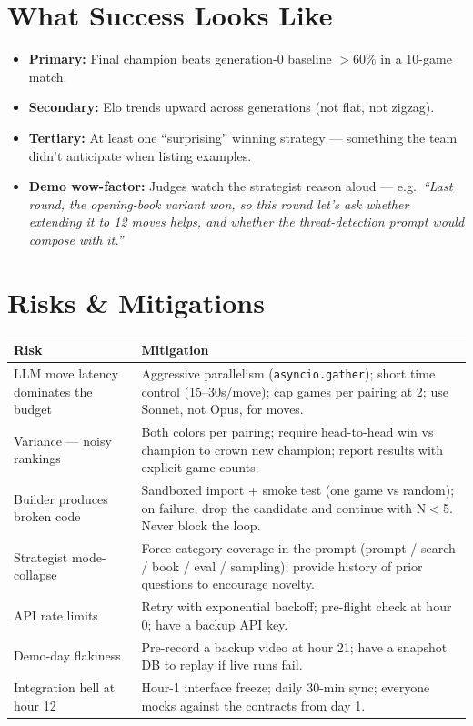 \documentclass[11pt]{article}
\begin{document}
\section{What Success Looks Like}

\begin{itemize}[leftmargin=*]
    \item \textbf{Primary:} Final champion beats generation-0 baseline $>60\%$ in a 10-game match.
    \item \textbf{Secondary:} Elo trends upward across generations (not flat, not zigzag).
    \item \textbf{Tertiary:} At least one ``surprising'' winning strategy --- something the team didn't anticipate when listing examples.
    \item \textbf{Demo wow-factor:} Judges watch the strategist reason aloud --- e.g.\ \textit{``Last round, the opening-book variant won, so this round let's ask whether extending it to 12 moves helps, and whether the threat-detection prompt would compose with it.''}
\end{itemize}

\section{Risks \& Mitigations}

\begin{center}
\renewcommand{\arraystretch}{1.3}
\begin{tabular}{@{}p{}p{}@{}}
\toprule
\textbf{Risk} & \textbf{Mitigation} \\
\midrule
LLM move latency dominates the budget & Aggressive parallelism (\texttt{asyncio.gather}); short time control (15--30s/move); cap games per pairing at 2; use Sonnet, not Opus, for moves. \\
Variance --- noisy rankings & Both colors per pairing; require head-to-head win vs champion to crown new champion; report results with explicit game counts. \\
Builder produces broken code & Sandboxed import + smoke test (one game vs random); on failure, drop the candidate and continue with N$<$5. Never block the loop. \\
Strategist mode-collapse & Force category coverage in the prompt (prompt / search / book / eval / sampling); provide history of prior questions to encourage novelty. \\
API rate limits & Retry with exponential backoff; pre-flight check at hour 0; have a backup API key. \\
Demo-day flakiness & Pre-record a backup video at hour 21; have a snapshot DB to replay if live runs fail. \\
Integration hell at hour 12 & Hour-1 interface freeze; daily 30-min sync; everyone mocks against the contracts from day 1. \\
\bottomrule
\end{tabular}
\end{center}
\end{document}
